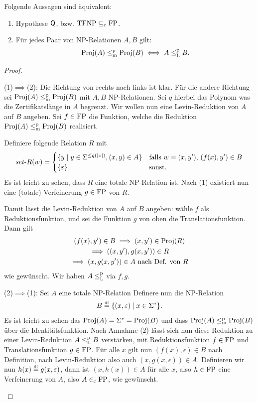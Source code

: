 \begin{theorem}\label{thm:q-as-levin}
    Folgende Aussagen sind äquivalent:
    \begin{enumerate}
        \item Hypothese $\mathsf{Q}$, bzw. $\mathrm{TFNP}\subseteq_\mathrm{c}\mathrm{FP}$. 
        \item Für jedes Paar von NP-Relationen $A, B$ gilt:
            \[ \operatorname{Proj}(A) \leq_\mathrm{m}^\mathrm{p} \operatorname{Proj}(B) \iff A \leq_\mathrm{L}^\mathrm{p} B. \]
    \end{enumerate}
\end{theorem}
\begin{proof}
    \begin{prooflist}
\item (1)$\implies$(2): Die Richtung von rechts nach links ist klar. Für die andere Richtung sei $\operatorname{Proj}(A) \leq_\mathrm{m}^\mathrm{p} \operatorname{Proj}(B)$ mit $A,B$ NP-Relationen. Sei $q$ hierbei das Polynom was die Zertifikatslänge in $A$ begrenzt.
    Wir wollen nun eine Levin-Reduktion von $A$ auf $B$ angeben. Sei $f\in \mathrm{FP}$ die Funktion, welche die Reduktion $\operatorname{Proj}(A) \leq_\mathrm{m}^\mathrm{p} \operatorname{Proj}(B)$ realisiert.

    Definiere folgende Relation $R$ mit
    \[ \mathit{set}\text{-}{}R(w) = \begin{cases} \{ y\mid y\in\Sigma^{\leq q(|x|)}, (x,y)\in A \} & \text{falls $w=(x,y')$, $(f(x), y')\in B$} \\  \{\varepsilon\} & \text{sonst}. \end{cases} \]
    Es ist leicht zu sehen, dass $R$ eine totale NP-Relation ist. Nach (1) existiert nun eine (totale) Verfeinerung $g\in \mathrm{FP}$ von $R$.

    Damit lässt die Levin-Reduktion von $A$ auf $B$ angeben: wähle $f$ als Reduktionsfunktion, und sei die Funktion $g$ von oben die Translationsfunktion. Dann gilt
    \begin{gather*}
        (f(x), y') \in B \implies (x, y')\in\operatorname{Proj}(R) \\
        \implies ((x, y'), g(x, y'))\in R\\
        \implies (x, g(x, y')) \in A \text{ nach Def. von $R$}
    \end{gather*}
    wie gewünscht. Wir haben $A\leq_\mathrm{L}^\mathrm{p}$ via $f, g$.
\item (2)$\implies$(1): Sei $A$ eine totale NP-Relation
    Definere nun die NP-Relation
    \[ B \stackrel{\text{\smash{\tiny df}}}{=} \{ (x, \varepsilon) \mid x\in\Sigma^* \}. \]
    Es ist leicht zu sehen das $\operatorname{Proj}(A)=\Sigma^*=\operatorname{Proj}(B)$ und dass $\operatorname{Proj}(A)\leq_\mathrm{m}^\mathrm{p}\operatorname{Proj}(B)$ über die Identitätsfunktion.
    Nach Annahme (2) lässt sich nun diese Reduktion zu einer Levin-Reduktion $A\leq_\mathrm{L}^\mathrm{p} B$ verstärken, mit Reduktionsfunktion $f\in\mathrm{FP}$ und  Translationsfunktion $g\in\mathrm{FP}$.
    Für alle $x$ gilt nun $(f(x),\epsilon)\in B$ nach Definition,
    nach Levin-Reduktion also auch $(x, g(x, \epsilon))\in A$.
    Definieren wir nun $h(x)\stackrel{\text{\smash{\tiny df}}}{=} g(x,\varepsilon)$, dann ist $(x, h(x))\in A$ für alle $x$, also $h\in\mathrm{FP}$ eine Verfeinerung von $A$, also $A\in_\mathrm{c} \mathrm{FP}$, wie gewünscht.
\end{prooflist}
\end{proof}

